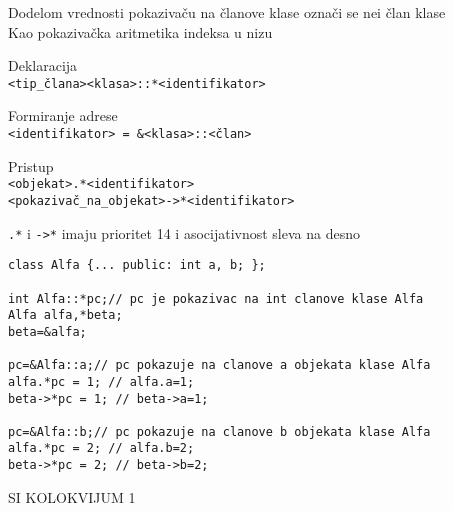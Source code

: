 \documentclass{article}
\newenvironment{xitemize}{%
    
    \itemize
    \larger
}{%
    \enditemize
}
\let\olditemize\itemize
\let\endolditemize\enditemize
\renewenvironment{itemize}{%
    \smaller
    \olditemize
}{%
    \endolditemize
}
\providecommand{\inlinecode}[1]{\texttt{#1}}
\begin{document}
\begin{xitemize}
\begin{itemize}
    \item Dodelom vrednosti pokazivaču na članove klase označi se nei član klase\\
    Kao pokazivačka aritmetika indeksa u nizu
    \item Deklaracija\\
    \inlinecode{<tip\_člana><klasa>::*<identifikator>}
    \item Formiranje adrese\\
    \inlinecode{<identifikator> = \&<klasa>::<član>}
    \item Pristup\\
    \inlinecode{<objekat>.*<identifikator>}\\
    \inlinecode{<pokazivač\_na\_objekat>->*<identifikator>}
    \item \inlinecode{.*} i \inlinecode{->*} imaju prioritet 14 i asocijativnost sleva na desno
    \begin{lstlisting}
class Alfa {... public: int a, b; };

int Alfa::*pc;// pc je pokazivac na int clanove klase Alfa
Alfa alfa,*beta;
beta=&alfa;

pc=&Alfa::a;// pc pokazuje na clanove a objekata klase Alfa
alfa.*pc = 1; // alfa.a=1;
beta->*pc = 1; // beta->a=1;

pc=&Alfa::b;// pc pokazuje na clanove b objekata klase Alfa
alfa.*pc = 2; // alfa.b=2;
beta->*pc = 2; // beta->b=2;
    \end{lstlisting}
\end{itemize}
\end{xitemize}
\begin{center}
    SI KOLOKVIJUM 1
\end{center}
\noindent\makebox[\linewidth]{\rule{\paperwidth}{0.4pt}}
\end{document}
